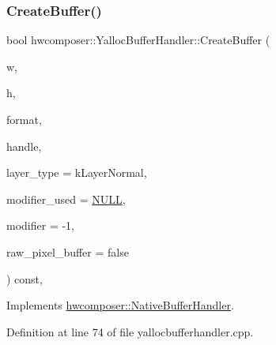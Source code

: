 \subsubsection{\texorpdfstring{Create\+Buffer()}{CreateBuffer()}}
{\footnotesize\ttfamily bool hwcomposer\+::\+Yalloc\+Buffer\+Handler\+::\+Create\+Buffer (\begin{DoxyParamCaption}\item[{uint32\+\_\+t}]{w,  }\item[{uint32\+\_\+t}]{h,  }\item[{int}]{format,  }\item[{\mbox{\hyperlink{alios_2platformdefines_8h_ac0a2eaf260f556d17fe489911f017bdf}{H\+W\+C\+Native\+Handle}} $\ast$}]{handle,  }\item[{uint32\+\_\+t}]{layer\+\_\+type = {\ttfamily kLayerNormal},  }\item[{bool $\ast$}]{modifier\+\_\+used = {\ttfamily \mbox{\hyperlink{alios_2platformdefines_8h_a070d2ce7b6bb7e5c05602aa8c308d0c4}{N\+U\+LL}}},  }\item[{int64\+\_\+t}]{modifier = {\ttfamily -\/1},  }\item[{bool}]{raw\+\_\+pixel\+\_\+buffer = {\ttfamily false} }\end{DoxyParamCaption}) const\hspace{0.3cm}{\ttfamily [override]}, {\ttfamily [virtual]}}



Implements \mbox{\hyperlink{classhwcomposer_1_1NativeBufferHandler_a7e58e3d81d3f56cbee34c963b4999fde}{hwcomposer\+::\+Native\+Buffer\+Handler}}.



Definition at line 74 of file yallocbufferhandler.\+cpp.


